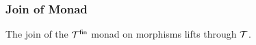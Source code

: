\subsubsection{Join of Monad}

\begin{theorem}
    The join of the $\mathcal{T}^{\mathsf{fin}}$ monad on morphisms lifts through $\mathcal{T}$.
\begin{center}
\end{center}
\end{theorem}
